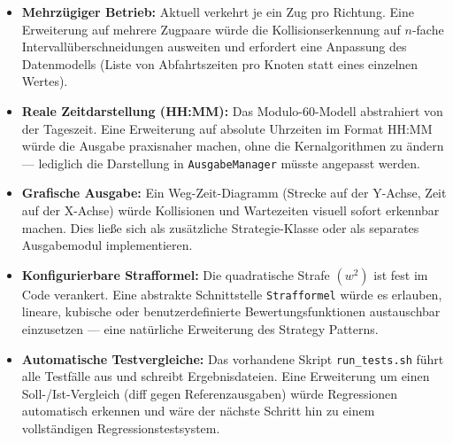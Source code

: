 \documentclass[12pt,a4paper]{article}
\begin{document}
\begin{itemize}
  \item \textbf{Mehrzügiger Betrieb:} Aktuell verkehrt je ein Zug pro Richtung.
    Eine Erweiterung auf mehrere Zugpaare würde die Kollisionserkennung auf
    $n$-fache Intervallüberschneidungen ausweiten und erfordert eine Anpassung
    des Datenmodells (Liste von Abfahrtszeiten pro Knoten statt eines einzelnen Wertes).

  \item \textbf{Reale Zeitdarstellung (HH:MM):} Das Modulo-60-Modell abstrahiert von
    der Tageszeit. Eine Erweiterung auf absolute Uhrzeiten im Format HH:MM würde
    die Ausgabe praxisnaher machen, ohne die Kernalgorithmen zu ändern — lediglich
    die Darstellung in \texttt{AusgabeManager} müsste angepasst werden.

  \item \textbf{Grafische Ausgabe:} Ein Weg-Zeit-Diagramm (Strecke auf der Y-Achse,
    Zeit auf der X-Achse) würde Kollisionen und Wartezeiten visuell sofort erkennbar
    machen. Dies ließe sich als zusätzliche Strategie-Klasse oder als separates
    Ausgabemodul implementieren.

  \item \textbf{Konfigurierbare Strafformel:} Die quadratische Strafe $(w^2)$ ist
    fest im Code verankert. Eine abstrakte Schnittstelle \texttt{Strafformel} würde
    es erlauben, lineare, kubische oder benutzerdefinierte Bewertungsfunktionen
    austauschbar einzusetzen — eine natürliche Erweiterung des Strategy Patterns.

  \item \textbf{Automatische Testvergleiche:} Das vorhandene Skript \texttt{run\_tests.sh}
    führt alle Testfälle aus und schreibt Ergebnisdateien. Eine Erweiterung um einen
    Soll-/Ist-Vergleich (diff gegen Referenzausgaben) würde Regressionen automatisch
    erkennen und wäre der nächste Schritt hin zu einem vollständigen Regressionstestsystem.
\end{itemize}
\end{document}
